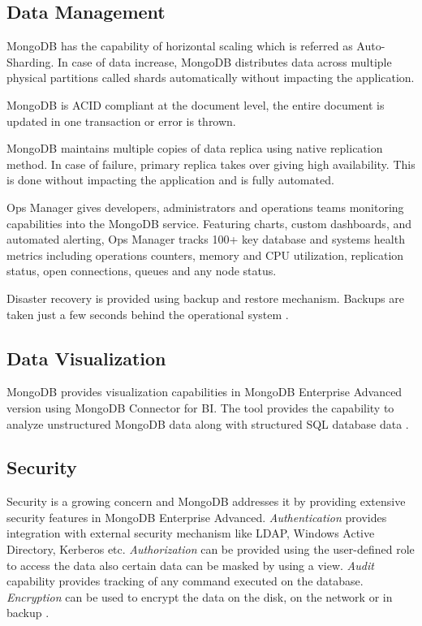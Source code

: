 \documentclass[sigconf]{acmart}
\begin{document}
\subsection{Data Management}
MongoDB has the capability of horizontal scaling which is referred as Auto-Sharding. In case of data increase, MongoDB distributes data across multiple physical partitions called shards automatically without impacting the application. 

MongoDB is ACID compliant at the document level, the entire document is updated in one transaction or error is thrown.

MongoDB maintains multiple copies of data replica using native replication method. In case of failure, primary replica takes over giving high availability. This is done without impacting the application and is fully automated. 

Ops Manager gives developers, administrators and operations teams monitoring capabilities into the MongoDB service. Featuring charts, custom dashboards, and automated alerting, Ops Manager tracks 100+ key database and systems health metrics including operations counters, memory and CPU utilization, replication status, open connections, queues and any node status.

Disaster recovery is provided using backup and restore mechanism. Backups are taken just a few seconds behind the operational system \cite{www-mongo-arch}.

\subsection{Data Visualization}
MongoDB provides visualization capabilities in MongoDB Enterprise Advanced version using MongoDB Connector for BI. The tool provides the capability to analyze unstructured MongoDB data along with structured SQL database data \cite{www-mongo-arch}.

\subsection{Security}
Security is a growing concern and MongoDB addresses it by providing extensive security features in MongoDB Enterprise Advanced. \emph{Authentication} provides integration with external security mechanism like LDAP, Windows Active Directory, Kerberos etc. \emph{Authorization} can be provided using the user-defined role to access the data also certain data can be masked by using a view. \emph{Audit} capability provides tracking of any command executed on the database. \emph{Encryption} can be used to encrypt the data on the disk, on the network or in backup \cite{www-mongo-arch}. 
\end{document}
